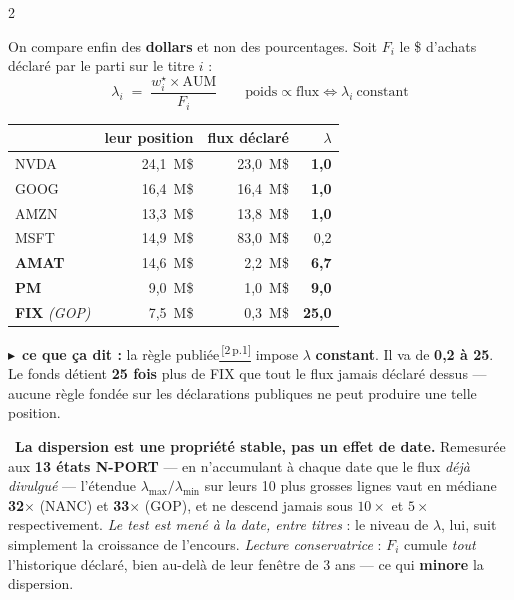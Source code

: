 \documentclass[9pt,a4paper]{extarticle}
\newcommand{\et}[2]{\vspace{1.6mm}{\color{bleu}\bfseries #1 $\cdot$ #2}\par\vspace{0.2mm}}
\newcommand{\obs}[1]{\vspace{0.2mm}\hangindent=3.4mm\hangafter=0{\color{bleu}\footnotesize\textbullet}~{\small #1}\par\vspace{0.2mm}}
\newcommand{\lire}[1]{{\scriptsize\color{vert}$\blacktriangleright$~\textbf{ce que ça dit :} #1}\par}
\newcommand{\rf}[3]{\href{docs_nanc_gop/#2\#page=#3}{\color{bleu}\textsuperscript{\,[#1\,p.#3]}}}
\newcommand{\sCoop}[1]{\rf{2}{2-cooper-la-regle-du-gerant-20231119.pdf}{#1}}
\begin{document}
\begin{multicols}{2}
\et{e}{D'où vient l'écart}
On compare enfin des \textbf{dollars} et non des pourcentages. Soit $F_i$ le \$ d'achats déclaré par le parti sur le titre $i$ :
\[ \lambda_i \;=\; \frac{w^{\star}_i\times\mathrm{AUM}}{F_i}
   \qquad\text{poids}\propto\text{flux}\iff \lambda_i\ \text{constant} \]
\begin{center}\scriptsize
\begin{tabular}{@{}l r r r@{}}
\toprule
 & leur position & flux déclaré & $\lambda$ \\
\midrule
NVDA & 24,1~M\$ & 23,0~M\$ & \textbf{1,0} \\
GOOG & 16,4~M\$ & 16,4~M\$ & \textbf{1,0} \\
AMZN & 13,3~M\$ & 13,8~M\$ & \textbf{1,0} \\
MSFT & 14,9~M\$ & 83,0~M\$ & 0,2 \\
\textbf{AMAT} & 14,6~M\$ & 2,2~M\$ & \textbf{6,7} \\
\textbf{PM} & 9,0~M\$ & 1,0~M\$ & \textbf{9,0} \\
\textbf{FIX} \emph{(GOP)} & 7,5~M\$ & 0,3~M\$ & \textbf{25,0} \\
\bottomrule
\end{tabular}
\end{center}
\lire{la règle publiée\sCoop{1} impose $\lambda$ \textbf{constant}. Il va de \textbf{0,2 à 25}. Le fonds détient \textbf{25 fois} plus de FIX que tout le flux jamais déclaré dessus --- aucune règle fondée sur les déclarations publiques ne peut produire une telle position.}
\obs{\textbf{La dispersion est une propriété stable, pas un effet de date.} Remesurée aux \textbf{13 états N-PORT} --- en n'accumulant à chaque date que le flux \emph{déjà divulgué} --- l'étendue $\lambda_{\max}/\lambda_{\min}$ sur leurs 10 plus grosses lignes vaut en médiane \textbf{32$\times$} (NANC) et \textbf{33$\times$} (GOP), et ne descend jamais sous $10\times$ et $5\times$ respectivement. \emph{Le test est mené à la date, entre titres} : le niveau de $\lambda$, lui, suit simplement la croissance de l'encours. \emph{Lecture conservatrice} : $F_i$ cumule \emph{tout} l'historique déclaré, bien au-delà de leur fenêtre de 3 ans --- ce qui \textbf{minore} la dispersion.}


\end{multicols}
\end{document}
